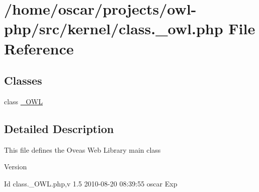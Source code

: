 \section{/home/oscar/projects/owl-\/php/src/kernel/class.\_\-owl.php File Reference}
\label{class_8__owl_8php}
\subsection*{Classes}
\begin{DoxyCompactItemize}
\item 
class \hyperlink{class__OWL}{\_\-OWL}
\end{DoxyCompactItemize}


\subsection{Detailed Description}
This file defines the Oveas Web Library main class \begin{DoxyVersion}{Version}

\end{DoxyVersion}
\begin{DoxyParagraph}{Id}
class.\_\-OWL.php,v 1.5 2010-\/08-\/20 08:39:55 oscar Exp 
\end{DoxyParagraph}
